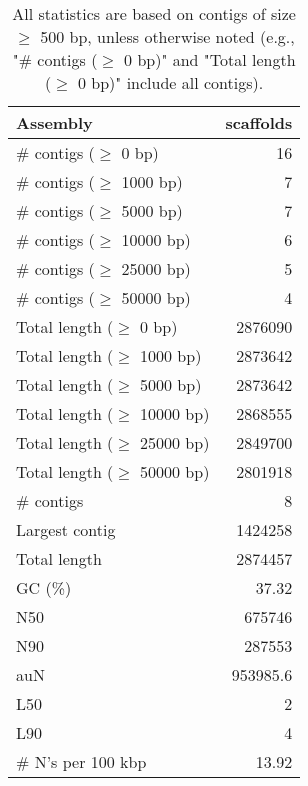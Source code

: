 \documentclass[12pt,a4paper]{article}
\begin{document}
\begin{table}[ht]
\begin{center}
\caption{All statistics are based on contigs of size $\geq$ 500 bp, unless otherwise noted (e.g., "\# contigs ($\geq$ 0 bp)" and "Total length ($\geq$ 0 bp)" include all contigs).}
\begin{tabular}{|l*{1}{|r}|}
\hline
Assembly & scaffolds \\ \hline
\# contigs ($\geq$ 0 bp) & 16 \\ \hline
\# contigs ($\geq$ 1000 bp) & 7 \\ \hline
\# contigs ($\geq$ 5000 bp) & 7 \\ \hline
\# contigs ($\geq$ 10000 bp) & 6 \\ \hline
\# contigs ($\geq$ 25000 bp) & 5 \\ \hline
\# contigs ($\geq$ 50000 bp) & 4 \\ \hline
Total length ($\geq$ 0 bp) & 2876090 \\ \hline
Total length ($\geq$ 1000 bp) & 2873642 \\ \hline
Total length ($\geq$ 5000 bp) & 2873642 \\ \hline
Total length ($\geq$ 10000 bp) & 2868555 \\ \hline
Total length ($\geq$ 25000 bp) & 2849700 \\ \hline
Total length ($\geq$ 50000 bp) & 2801918 \\ \hline
\# contigs & 8 \\ \hline
Largest contig & 1424258 \\ \hline
Total length & 2874457 \\ \hline
GC (\%) & 37.32 \\ \hline
N50 & 675746 \\ \hline
N90 & 287553 \\ \hline
auN & 953985.6 \\ \hline
L50 & 2 \\ \hline
L90 & 4 \\ \hline
\# N's per 100 kbp & 13.92 \\ \hline
\end{tabular}
\end{center}
\end{table}
\end{document}
